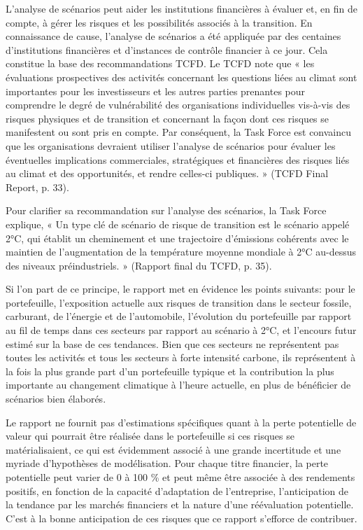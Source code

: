 \documentclass[10pt,table,a4]{article}\usepackage[]{graphicx}\usepackage[]{color}
\begin{document}
\begin{multicols}{2}
{		
		L'analyse de scénarios peut aider les institutions financières à évaluer et, en fin de compte, à gérer les risques et les possibilités associés à la transition. En connaissance de cause, l'analyse de scénarios a été appliquée par des centaines d'institutions financières et d'instances de contrôle financier à ce jour. Cela constitue la base des recommandations TCFD. Le TCFD note que « les évaluations prospectives des activités concernant les questions liées au climat sont importantes pour les investisseurs et les autres parties prenantes pour comprendre le degré de vulnérabilité des organisations individuelles vis-à-vis des risques physiques et de transition et concernant la façon dont ces risques se manifestent ou sont pris en compte. Par conséquent, la Task Force est convaincu que les organisations devraient utiliser l'analyse de scénarios pour évaluer les éventuelles implications commerciales, stratégiques et financières des risques liés au climat et des opportunités, et rendre celles-ci publiques. » (TCFD Final Report, p. 33).
		
		Pour clarifier sa recommandation sur l'analyse des scénarios, la Task Force explique, « Un type clé de scénario de risque de transition est le scénario appelé 2°C,
		qui établit un cheminement et une trajectoire d'émissions cohérents avec le maintien de l'augmentation de la température moyenne mondiale à 2°C au-dessus des niveaux préindustriels. » (Rapport final du TCFD, p. 35).
		
		
	Si l'on part de ce principe, le rapport met en évidence les points suivants: pour le portefeuille, l'exposition actuelle aux risques de transition dans le secteur fossile, carburant, de l'énergie et de l'automobile, l'évolution du portefeuille par rapport au fil de temps dans ces secteurs par rapport au scénario à 2°C, et l'encours futur estimé sur la base de ces tendances. Bien que ces secteurs ne représentent pas toutes les activités et tous les secteurs à forte intensité carbone, ils représentent à la fois la plus grande part d'un portefeuille typique et la contribution la plus importante au changement climatique à l'heure actuelle, en plus de bénéficier de scénarios bien élaborés. 
		
Le rapport ne fournit pas d'estimations spécifiques quant à la perte potentielle de valeur qui pourrait être réalisée dans le portefeuille si ces risques se matérialisaient, ce qui est évidemment associé à une grande incertitude et une myriade d'hypothèses de modélisation. Pour chaque titre financier, la perte potentielle peut varier de 0 à 100 \% et peut même être associée à des rendements positifs, en fonction de la capacité d'adaptation de l'entreprise, l'anticipation de la tendance par les marchés financiers et la nature d'une réévaluation potentielle. C'est à la bonne anticipation de ces risques que ce rapport s'efforce de contribuer.}




		
	\vspace{-0.4cm}	
		
	\end{multicols}
\end{document}
